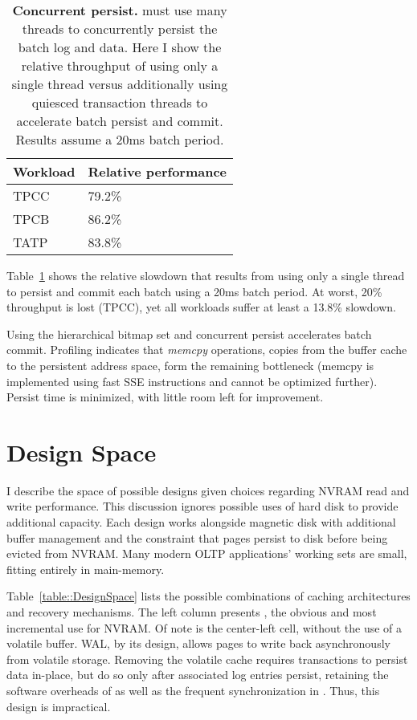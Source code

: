 \begin{table}
  \centering
  \begin{tabular}{l l}
    \hline
    Workload & Relative performance \\
    \hline \hline
    TPCC & 79.2\% \\
    TPCB & 86.2\% \\
    TATP & 83.8\% \\
    \hline
  \end{tabular}
  \caption{\textbf{Concurrent \GroupCommit persist.} \GroupCommit must use many threads to concurrently persist the batch log and data.  Here I show the relative throughput of using only a single thread versus additionally using quiesced transaction threads to accelerate batch persist and commit.  Results assume a 20ms batch period.}
  \label{table::ConcurrentPersist}
\end{table}

Table~\ref{table::ConcurrentPersist} shows the relative slowdown that results from using only a single thread to persist and commit each batch using a 20ms batch period.
At worst, 20\% throughput is lost (TPCC), yet all workloads suffer at least a 13.8\% slowdown.

Using the hierarchical bitmap set and concurrent persist accelerates batch commit.
Profiling indicates that \emph{memcpy} operations, copies from the buffer cache to the persistent address space, form the remaining bottleneck (memcpy is implemented using fast SSE instructions and cannot be optimized further).
Persist time is minimized, with little room left for improvement.

\section{Design Space}
\label{sec:OLTP_design:Designs}
I describe the space of possible designs given choices regarding NVRAM read and write performance.
This discussion ignores possible uses of hard disk to provide additional capacity.
Each design works alongside magnetic disk with additional buffer management and the constraint that pages persist to disk before being evicted from NVRAM.
Many modern OLTP applications' working sets are small, fitting entirely in main-memory.

Table~\ref{table::DesignSpace} lists the possible combinations of caching architectures and recovery mechanisms.
The left column presents \NVDisk, the obvious and most incremental use for NVRAM.
Of note is the center-left cell, \NVDisk without the use of a volatile buffer.
WAL, by its design, allows pages to write back asynchronously from volatile storage.
Removing the volatile cache requires transactions to persist data in-place, but do so only after associated log entries persist, retaining the software overheads of \NVDisk as well as the frequent synchronization in \InPlace.
Thus, this design is impractical.

